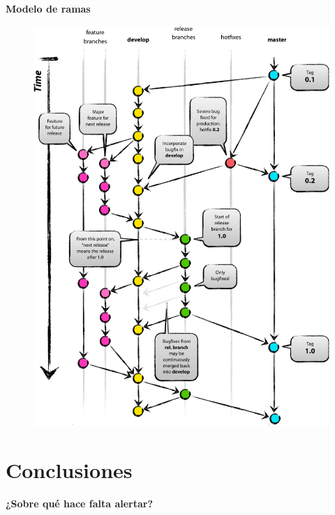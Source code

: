 \documentclass[11pt]{beamer}
\begin{document}
\begin{frame}{\textbf{\LARGE{Modelo de ramas}}}
	\vspace{-.7cm}
	\begin{figure}[H]
		{\includegraphics[height=.8\textheight]{./imagenes/Git-branching-model.pdf}}
	\end{figure}	
\end{frame}

\section{Conclusiones}



\begin{frame}{\textbf{\LARGE{¿Sobre qué hace falta alertar?}}}
\fontsize{18pt}{18}\selectfont

\end{frame}
\end{document}
